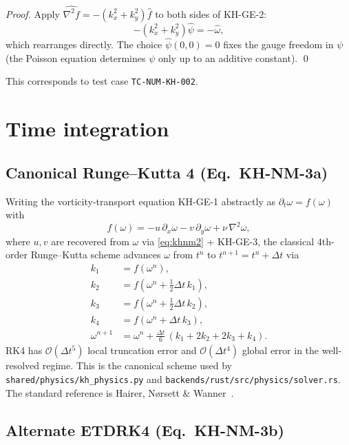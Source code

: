 \documentclass[11pt,a4paper]{article}
\theoremstyle{definition}
\theoremstyle{plain}
\begin{document}
\begin{proof}
Apply $\widehat{\nabla^2 f} = -(k_x^2 + k_y^2)\hat f$ to both sides
of KH-GE-2:
\[
-(k_x^2 + k_y^2)\hat\psi = -\hat\omega,
\]
which rearranges directly. The choice $\hat\psi(0,0) = 0$ fixes the
gauge freedom in $\psi$ (the Poisson equation determines $\psi$ only
up to an additive constant).
\qed
\end{proof}

This corresponds to test case \texttt{TC-NUM-KH-002}.

\section{Time integration}

\subsection{Canonical Runge--Kutta 4 (Eq.\ KH-NM-3a)}

Writing the vorticity-transport equation KH-GE-1 abstractly as
$\partial_t \omega = f(\omega)$ with
\[
f(\omega) = -u\,\partial_x \omega - v\,\partial_y \omega + \nu\,\nabla^2 \omega,
\]
where $u, v$ are recovered from $\omega$ via \eqref{eq:khnm2} +
KH-GE-3, the classical 4th-order Runge--Kutta scheme advances
$\omega$ from $t^n$ to $t^{n+1} = t^n + \Delta t$ via
\begin{equation}
\label{eq:khnm3a}
\begin{aligned}
k_1 &= f(\omega^n),\\
k_2 &= f(\omega^n + \tfrac{1}{2}\Delta t\,k_1),\\
k_3 &= f(\omega^n + \tfrac{1}{2}\Delta t\,k_2),\\
k_4 &= f(\omega^n + \Delta t\,k_3),\\
\omega^{n+1} &= \omega^n + \tfrac{\Delta t}{6}\,(k_1 + 2k_2 + 2k_3 + k_4).
\end{aligned}
\tag{KH-NM-3a}
\end{equation}
RK4 has $\mathcal{O}(\Delta t^5)$ local truncation error and
$\mathcal{O}(\Delta t^4)$ global error in the well-resolved regime.
This is the canonical scheme used by \texttt{shared/physics/kh\_physics.py}
and \texttt{backends/rust/src/physics/solver.rs}. The standard reference
is Hairer, N{\o}rsett \& Wanner~\cite{HairerNorsettWanner1993}.

\subsection{Alternate ETDRK4 (Eq.\ KH-NM-3b)}
\end{document}
